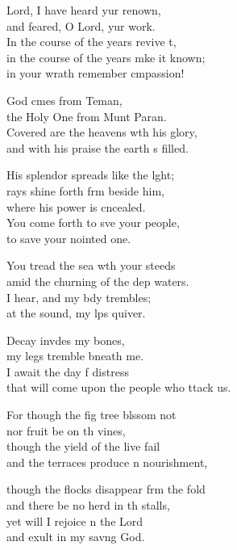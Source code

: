 \begin{psalmverse}
  \begin{patverse}
 Lord, I have heard yur renown,\Med\\
and feared, O Lord, yur work.\\
In the course of the years revive \pointup{\i}t,\Flex\\
in the course of the years mke it known;\Med\\
in your wrath remember cmpassion!

God cmes from Teman,\Med\\
the Holy One from Munt Paran.\\
Covered are the heavens w\pointup{\i}th his glory,\Med\\
and with his praise the earth \pointup{\i}s filled.

His splendor spreads like the l\pointup{\i}ght;\Flex\\
rays shine forth frm beside him,\Med\\
where his power is cncealed.\\
You come forth to sve your people,\Med\\
to save your nointed one.

You tread the sea w\pointup{\i}th your steeds\Med\\
amid the churning of the dep waters.\\
I hear, and my bdy trembles;\Med\\
at the sound, my l\pointup{\i}ps quiver.

Decay invdes my bones,\Med\\
my legs tremble bneath me.\\
I await the day f distress\Med\\
that will come upon the people who ttack us.

For though the fig tree blssom not\Med\\
nor fruit be on th vines,\\
though the yield of the live fail\Med\\
and the terraces produce n nourishment,

though the flocks disappear frm the fold\Med\\
and there be no herd in th stalls,\\
yet will I rejoice \pointup{\i}n the Lord\Med\\
and exult in my sav\pointup{\i}ng God.


\end{patverse}
\end{psalmverse}

